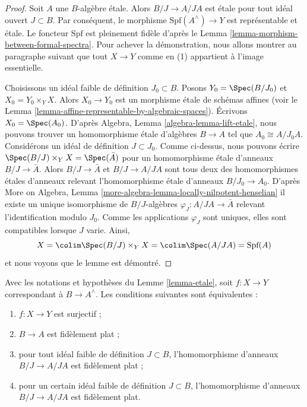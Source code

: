 \begin{proof}
Soit $A$ une $B$-algèbre étale. Alors $B/J \to A/JA$ est
étale pour tout idéal ouvert $J \subset B$. Par conséquent,
le morphisme $\text{Spf}(A^\wedge) \to Y$ est représentable et étale.
Le foncteur $\text{Spf}$ est pleinement fidèle d'après le
Lemma \ref{lemma-morphism-between-formal-spectra}.
Pour achever la démonstration, nous allons montrer au paragraphe suivant
que tout $X \to Y$ comme en (1) appartient à l'image essentielle.

\medskip\noindent
Choisissons un idéal faible de définition $J_0 \subset B$. Posons
$Y_0 = \Spec(B/J_0)$ et $X_0 = Y_0 \times_Y X$. Alors $X_0 \to Y_0$
est un morphisme étale de schémas affines (voir le
Lemma \ref{lemma-affine-representable-by-algebraic-spaces}).
Écrivons $X_0 = \Spec(A_0)$. D'après Algebra, Lemma \ref{algebra-lemma-lift-etale},
nous pouvons trouver un homomorphisme étale d'algèbres $B \to A$ tel que
$A_0 \cong A/J_0A$. Considérons un idéal de définition $J \subset J_0$.
Comme ci-dessus, nous pouvons écrire $\Spec(B/J) \times_Y X = \Spec(\bar A)$
pour un homomorphisme étale d'anneaux $B/J \to \bar A$. Alors
$B/J \to \bar A$ et $B/J \to A/JA$ sont tous deux des homomorphismes étales d'anneaux
relevant l'homomorphisme étale d'anneaux $B/J_0 \to A_0$. D'après
More on Algebra, Lemma \ref{more-algebra-lemma-locally-nilpotent-henselian}
il existe un unique isomorphisme de $B/J$-algèbres
$\varphi_J : A/JA \to \bar A$ relevant l'identification modulo $J_0$.
Comme les applications $\varphi_J$ sont uniques, elles sont compatibles lorsque $J$ varie.
Ainsi,
$$
X = \colim \Spec(B/J) \times_Y X = \colim \Spec(A/JA) = \text{Spf}(A)
$$
et nous voyons que le lemme est démontré.
\end{proof}

\begin{lemma}
\label{lemma-etale-surjective}
Avec les notations et hypothèses du Lemme \ref{lemma-etale}, soit
$f : X \to Y$ correspondant à $B \to A^\wedge$. Les conditions suivantes sont équivalentes :
\begin{enumerate}
\item $f : X \to Y$ est surjectif ;
\item $B \to A$ est fidèlement plat ;
\item pour tout idéal faible de définition $J \subset B$,
l'homomorphisme d'anneaux $B/J \to A/JA$ est fidèlement plat ;
\item pour un certain idéal faible de définition $J \subset B$,
l'homomorphisme d'anneaux $B/J \to A/JA$ est fidèlement plat.
\end{enumerate}
\end{lemma}

